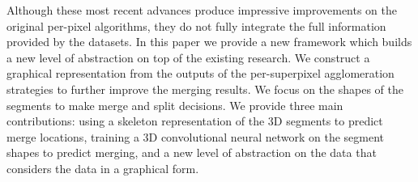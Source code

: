 Although these most recent advances produce impressive improvements on the original per-pixel algorithms, they do not fully integrate the full information provided by the datasets.
In this paper we provide a new framework which builds a new level of abstraction on top of the existing research. 
We construct a graphical representation from the outputs of the per-superpixel agglomeration strategies to further improve the merging results.
We focus on the shapes of the segments to make merge and split decisions. 
We provide three main contributions: using a skeleton representation of the 3D segments to predict merge locations, training a 3D convolutional neural network on the segment shapes to predict merging, and a new level of abstraction on the data that considers the data in a graphical form.